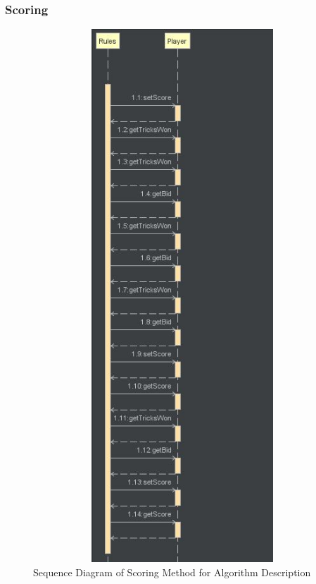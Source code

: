\subsubsection{Scoring}
\begin{figure}
\centering
\label{fig:Scoring}
\includegraphics[width=15cm ,height=20cm,keepaspectratio]{ScoringSequenceDiagram}
\caption{Sequence Diagram of Scoring Method for Algorithm Description}
\end{figure}
